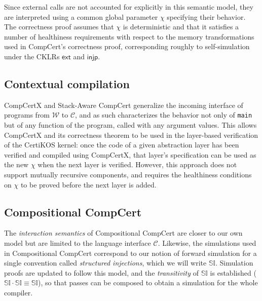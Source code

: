 \documentclass[draft,11pt]{report}
\theoremstyle{definition}
\newcommand{\kw}[1]{\ensuremath{ \mathsf{#1} }}
\begin{document}
Since external calls are not accounted for explicitly
in this semantic model,
they are interpreted %
using a common global parameter $\chi$
specifying their behavior.
The correctness proof assumes that $\chi$ is deterministic
and that it satisfies a number of healthiness requirements
with respect to the memory transformations
used in CompCert's correctness proof,
corresponding roughly to self-simulation
under the CKLRs $\kw{ext}$ and $\kw{injp}$.


\subsection{Contextual compilation} \label{sec:compcertx} %

CompCertX \citep{popl15} and
Stack-Aware CompCert \citep{stackaware}
generalize
the incoming interface of programs
from $\mathcal{W}$ to $\mathcal{C}$,
and as such characterizes the behavior
not only of \texttt{main}
but of any function of the program,
called with any argument values.
This allows CompCertX and its correctness theorem
to be used in the layer-based verification of
the CertiKOS kernel:
once the code of a given abstraction layer has been verified
and compiled using CompCertX,
that layer's specification can be used as the new $\chi$
when the next layer is verified.
However,
this approach does not support
mutually recursive components,
and requires the healthiness conditions on $\chi$
to be proved before the next layer is added.


\subsection{Compositional CompCert} %

The \emph{interaction semantics} of
Compositional CompCert \citep{compcompcert}
are closer to our own model
but are limited to the language interface $\mathcal{C}$.
Likewise, the simulations used in Compositional CompCert
correspond to our notion of forward simulation
for a single convention called \emph{structured injections},
which we will write $\mathbb{SI}$.
Simulation proofs are updated to follow this model,
and the \emph{transitivity} of $\mathbb{SI}$ is established
($\mathbb{SI} \cdot \mathbb{SI} \equiv \mathbb{SI}$),
so that passes can be composed
to obtain a simulation for the whole compiler.
\end{document}
